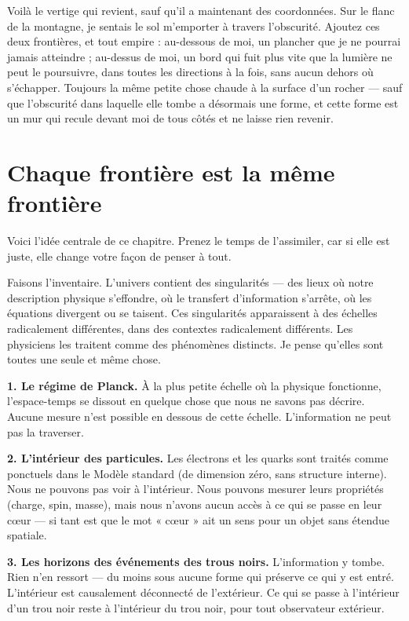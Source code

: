 \documentclass[11pt, twoside, openright]{book}
\begin{document}
Voilà le vertige qui revient, sauf qu'il a maintenant des coordonnées. Sur le flanc de la montagne, je sentais le sol m'emporter à travers l'obscurité. Ajoutez ces deux frontières, et tout empire : au-dessous de moi, un plancher que je ne pourrai jamais atteindre ; au-dessus de moi, un bord qui fuit plus vite que la lumière ne peut le poursuivre, dans toutes les directions à la fois, sans aucun dehors où s'échapper. Toujours la même petite chose chaude à la surface d'un rocher --- sauf que l'obscurité dans laquelle elle tombe a désormais une forme, et cette forme est un mur qui recule devant moi de tous côtés et ne laisse rien revenir.


\section*{Chaque frontière est la même frontière}

Voici l'idée centrale de ce chapitre. Prenez le temps de l'assimiler, car si elle est juste, elle change votre façon de penser à tout.

Faisons l'inventaire. L'univers contient des singularités --- des lieux où notre description physique s'effondre, où le transfert d'information s'arrête, où les équations divergent ou se taisent. Ces singularités apparaissent à des échelles radicalement différentes, dans des contextes radicalement différents. Les physiciens les traitent comme des phénomènes distincts. Je pense qu'elles sont toutes une seule et même chose.

\textbf{1. Le régime de Planck.} À la plus petite échelle où la physique fonctionne, l'espace-temps se dissout en quelque chose que nous ne savons pas décrire. Aucune mesure n'est possible en dessous de cette échelle. L'information ne peut pas la traverser.

\textbf{2. L'intérieur des particules.} Les électrons et les quarks sont traités comme ponctuels dans le Modèle standard (de dimension zéro, sans structure interne). Nous ne pouvons pas voir à l'intérieur. Nous pouvons mesurer leurs propriétés (charge, spin, masse), mais nous n'avons aucun accès à ce qui se passe en leur cœur --- si tant est que le mot « cœur » ait un sens pour un objet sans étendue spatiale.

\textbf{3. Les horizons des événements des trous noirs.} L'information y tombe. Rien n'en ressort --- du moins sous aucune forme qui préserve ce qui y est entré. L'intérieur est causalement déconnecté de l'extérieur. Ce qui se passe à l'intérieur d'un trou noir reste à l'intérieur du trou noir, pour tout observateur extérieur.
\end{document}
